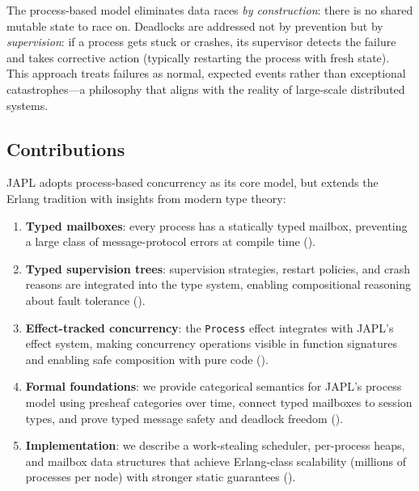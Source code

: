 \documentclass[11pt,a4paper]{article}
\begin{document}
The process-based model eliminates data races \emph{by construction}: there is no shared mutable state to race on. Deadlocks are addressed not by prevention but by \emph{supervision}: if a process gets stuck or crashes, its supervisor detects the failure and takes corrective action (typically restarting the process with fresh state). This approach treats failures as normal, expected events rather than exceptional catastrophes---a philosophy that aligns with the reality of large-scale distributed systems.

\subsection{Contributions}

JAPL adopts process-based concurrency as its core model, but extends the Erlang tradition with insights from modern type theory:

\begin{enumerate}
\item \textbf{Typed mailboxes}: every process has a statically typed mailbox, preventing a large class of message-protocol errors at compile time ().

\item \textbf{Typed supervision trees}: supervision strategies, restart policies, and crash reasons are integrated into the type system, enabling compositional reasoning about fault tolerance ().

\item \textbf{Effect-tracked concurrency}: the \texttt{Process} effect integrates with JAPL's effect system, making concurrency operations visible in function signatures and enabling safe composition with pure code ().

\item \textbf{Formal foundations}: we provide categorical semantics for JAPL's process model using presheaf categories over time, connect typed mailboxes to session types, and prove typed message safety and deadlock freedom ().

\item \textbf{Implementation}: we describe a work-stealing scheduler, per-process heaps, and mailbox data structures that achieve Erlang-class scalability (millions of processes per node) with stronger static guarantees ().
\end{enumerate}
\end{document}

